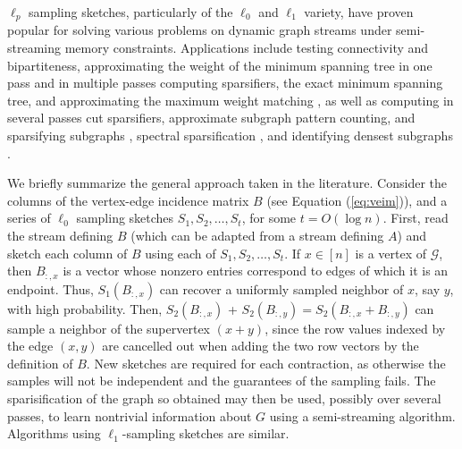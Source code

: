 \documentclass{report}
\begin{document}
$\ell_p$ sampling sketches, particularly of the $\ell_0$ and $\ell_1$ variety, have proven popular for solving various problems on dynamic graph streams under semi-streaming memory constraints.
Applications include testing connectivity and bipartiteness, approximating the weight of the minimum spanning tree in one pass and in multiple passes computing sparsifiers, the exact minimum spanning tree, and approximating the maximum weight matching \cite{ahn2012analyzing}, as well as computing in several passes cut sparsifiers, approximate subgraph pattern counting, and sparsifying subgraphs \cite{ahn2012graph}, spectral sparsification \cite{ahn2013spectral}, and identifying densest subgraphs \cite{vu2018data}. 

We briefly summarize the general approach taken in the literature.
Consider the columns of the vertex-edge incidence matrix $B$ (see Equation (\ref{eq:veim})), and a series of $\ell_0$ sampling sketches $S_1, S_2, \dots, S_t$, for some $t = O(\log n)$.
First, read the stream defining $B$ (which can be adapted from a stream defining $A$) and sketch each column of $B$ using each of $S_1, S_2, \dots, S_t$.
If $x \in [n]$ is a vertex of $\mathcal{G}$, then $B_{:,x}$ is a vector whose nonzero entries correspond to edges of which it is an endpoint. 
Thus, $S_1(B_{:,x})$ can recover a uniformly sampled neighbor of $x$, say $y$, with high probability. 
Then, $S_2(B_{:,x})$ + $S_2(B_{:,y}) = S_2(B_{:,x} + B_{:,y})$ can sample a neighbor of the supervertex $(x+y)$, since the row values indexed by the edge $(x,y)$ are cancelled out when adding the two row vectors by the definition of $B$. 
New sketches are required for each contraction, as otherwise the samples will not be independent and the guarantees of the sampling fails. 
The sparisification of the graph so obtained may then be used, possibly over several passes, to learn nontrivial information about $G$ using a semi-streaming algorithm. 
Algorithms using $\ell_1$-sampling sketches are similar. 
\end{document}
